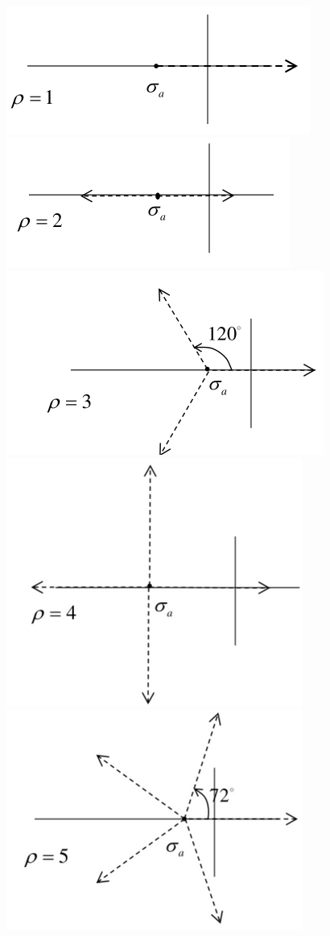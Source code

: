 \begin{figure}[h!]
  \centering
  \includegraphics[width=0.15\linewidth]{images/luogo_delle_radici_grado_relativo_1_inverso.png}
  \includegraphics[width=0.15\linewidth]{images/luogo_delle_radici_grado_relativo_2_inverso.png}
  \includegraphics[width=0.15\linewidth]{images/luogo_delle_radici_grado_relativo_3_inverso.png}
  \includegraphics[width=0.15\linewidth]{images/luogo_delle_radici_grado_relativo_4_inverso.png}
  \includegraphics[width=0.15\linewidth]{images/luogo_delle_radici_grado_relativo_5_inverso.png}
\end{figure}




